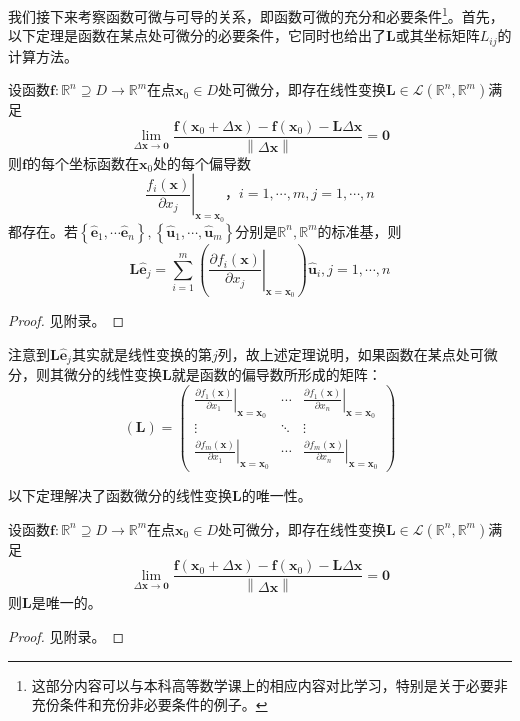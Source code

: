 \documentclass[main.tex]{subfiles}
\begin{document}
我们接下来考察函数可微与可导的关系，即函数可微的充分和必要条件\footnote{这部分内容可以与本科高等数学课上的相应内容对比学习，特别是关于必要非充份条件和充份非必要条件的例子\cite[“二、全微分存在的条件”,p.~20]{华工高数2009下}。}。首先，以下定理是函数在某点处可微分的必要条件，它同时也给出了$\mathbf{L}$或其坐标矩阵$L_{ij}$的计算方法。

\begin{theorem}\label{thm:II.12.3}
设函数$\mathbf{f}:\mathbb{R}^n\supseteq D\rightarrow\mathbb{R}^m$在点$\mathbf{x}_0\in D$处可微分，即存在线性变换$\mathbf{L}\in\mathcal{L}\left(\mathbb{R}^n,\mathbb{R}^m\right)$满足
\[
\lim_{\Delta\mathbf{x}\to\mathbf{0}}\frac{\mathbf{f}\left(\mathbf{x}_0+\Delta \mathbf{x}\right)-\mathbf{f}\left(\mathbf{x}_0\right)-\mathbf{L}\Delta\mathbf{x}}{\left\|\Delta\mathbf{x}\right\|}=\mathbf{0}
\]
则$\mathbf{f}$的每个坐标函数在$\mathbf{x}_0$处的每个偏导数
\[
\left.\frac{f_i\left(\mathbf{x}\right)}{\partial x_j}\right|_{\mathbf{x}=\mathbf{x}_0}，i=1,\cdots,m,j=1,\cdots,n
\]
都存在。若$\left\{\mathbf{\hat{e}}_1,\cdots\mathbf{\hat{e}}_n\right\},\left\{\mathbf{\hat{u}}_1,\cdots,\mathbf{\hat{u}}_m\right\}$分别是$\mathbb{R}^n,\mathbb{R}^m$的标准基，则
\[
\mathbf{L\hat{e}}_j=\sum_{i=1}^m\left(\left.\frac{\partial f_i\left(\mathbf{x}\right)}{\partial x_j}\right|_{\mathbf{x}=\mathbf{x}_0}\right)\mathbf{\hat{u}}_i,j=1,\cdots,n
\]
\end{theorem}
\begin{proof}
见附录。
\end{proof}

注意到$\mathbf{L\hat{e}}_j$其实就是线性变换的第$j$列，故上述定理说明，如果函数在某点处可微分，则其微分的线性变换$\mathbf{L}$就是函数的偏导数所形成的矩阵：
\[
\left(\mathbf{L}\right)=\left(\begin{array}{ccc}
\left.\frac{\partial f_1\left(\mathbf{x}\right)}{\partial x_1}\right|_{\mathbf{x}=\mathbf{x}_0}&\cdots&\left.\frac{\partial f_1\left(\mathbf{x}\right)}{\partial x_n}\right|_{\mathbf{x}=\mathbf{x}_0}\\
\vdots&\ddots&\vdots\\
\left.\frac{\partial f_m\left(\mathbf{x}\right)}{\partial x_1}\right|_{\mathbf{x}=\mathbf{x}_0}&\cdots&\left.\frac{\partial f_m\left(\mathbf{x}\right)}{\partial x_n}\right|_{\mathbf{x}=\mathbf{x}_0}
\end{array}\right)
\]

以下定理解决了函数微分的线性变换$\mathbf{L}$的唯一性。

\begin{theorem}\label{thm:II.12.4}
设函数$\mathbf{f}:\mathbb{R}^n\supseteq D\rightarrow\mathbb{R}^m$在点$\mathbf{x}_0\in D$处可微分，即存在线性变换$\mathbf{L}\in\mathcal{L}\left(\mathbb{R}^n,\mathbb{R}^m\right)$满足
\[
\lim_{\Delta\mathbf{x}\to\mathbf{0}}\frac{\mathbf{f}\left(\mathbf{x}_0+\Delta \mathbf{x}\right)-\mathbf{f}\left(\mathbf{x}_0\right)-\mathbf{L}\Delta\mathbf{x}}{\left\|\Delta\mathbf{x}\right\|}=\mathbf{0}
\]
则$\mathbf{L}$是唯一的。
\end{theorem}
\begin{proof}
见附录。
\end{proof}
\end{document}

